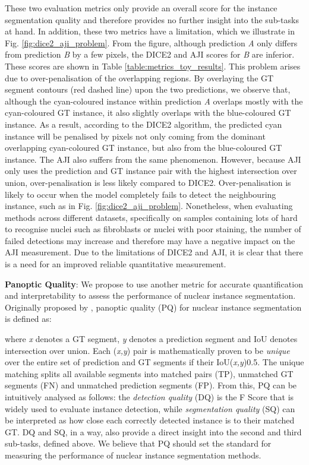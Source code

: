 \documentclass[journal]{IEEEtran}
\begin{document}
	These two evaluation metrics only provide an overall score for the instance segmentation quality and therefore provides no further insight into the sub-tasks at hand. In addition, these two metrics have a limitation, which we illustrate in Fig. \ref{fig:dice2_aji_problem}. From the figure, although prediction \textit{A} only differs from prediction \textit{B} by a few pixels, the DICE2 and AJI scores for \textit{B} are inferior. These scores are shown in Table \ref{table:metrics_toy_results}. This problem arises due to over-penalisation of the overlapping regions. By overlaying the GT segment contours (red dashed line) upon the two predictions, we observe that, although the cyan-coloured instance within prediction \textit{A} overlaps mostly with the cyan-coloured GT instance, it also slightly overlaps with the blue-coloured GT instance. As a result, according to the DICE2 algorithm, the predicted cyan instance will be penalised by pixels not only coming from the dominant overlapping cyan-coloured GT instance, but also from the blue-coloured GT instance. The AJI also suffers from the same phenomenon. However, because AJI only uses the prediction and GT instance pair with the highest intersection over union, over-penalisation is less likely compared to DICE2. Over-penalisation is likely to occur when the model completely fails to detect the neighbouring instance, such as in Fig. \ref{fig:dice2_aji_problem}. Nonetheless, when evaluating methods across different datasets, specifically on samples containing lots of hard to recognise nuclei such as fibroblasts or nuclei with poor staining, the number of failed detections may increase and therefore may have a negative impact on the AJI measurement. Due to the limitations of DICE2 and AJI, it is clear that there is a need for an improved reliable quantitative measurement.
	
	\textbf{Panoptic Quality}: We propose to use another metric for accurate quantification and interpretability to assess the performance of nuclear instance segmentation. Originally proposed by \cite{kirilov2018panoptic_quality}, panoptic quality (PQ) for nuclear instance segmentation is defined as:
	
	where \textit{x} denotes a GT segment, \textit{y} denotes a prediction segment and IoU denotes intersection over union. Each (\textit{x,y}) pair is mathematically proven to be \textit{unique} \cite{kirilov2018panoptic_quality} over the entire set of prediction and GT segments if their IoU(\textit{x,y})0.5. The unique matching splits all available segments into matched pairs (TP), unmatched GT segments (FN) and unmatched prediction segments (FP). From this, PQ can be intuitively analysed as follows: the \textit{detection quality} (DQ) is the F Score that is widely used to evaluate instance detection, while \textit{segmentation quality} (SQ) can be interpreted as how close each correctly detected instance is to their matched GT. DQ and SQ, in a way, also provide a direct insight into the second and third sub-tasks, defined above. We believe that PQ should set the standard for measuring the performance of nuclear instance segmentation methods.
	
\end{document}
